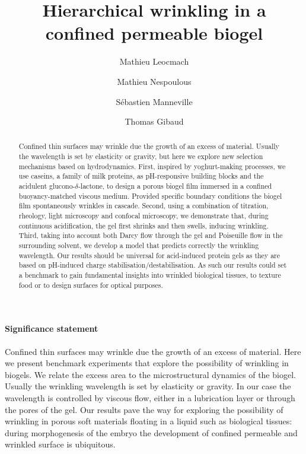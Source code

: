 \documentclass[twocolumn,superscriptaddress,showpacs,preprintnumbers,
amsmath,amssymb,prl]{revtex4-1}
\begin{document}
\title{Hierarchical wrinkling in a confined permeable biogel}
\author{Mathieu Leocmach}
\author{Mathieu Nespoulous}
\author{Sébastien Manneville}
\author{Thomas Gibaud}

\begin{abstract}
Confined thin surfaces may wrinkle due the growth of an excess of material. Usually the wavelength is set by elasticity or gravity, but here we explore new selection mechanisms based on hydrodynamics.
First, inspired by yoghurt-making processes, we use caseins, a family of milk proteins, as pH-responsive building blocks and the acidulent glucono-$\delta$-lactone, to design a porous biogel film immersed in a confined buoyancy-matched viscous medium.
Provided specific boundary conditions the biogel film spontaneously wrinkles in cascade.
Second, using a combination of titration, rheology, light microscopy and confocal microscopy, we demonstrate that, during continuous acidification, the gel first shrinks and then swells, inducing wrinkling. 
Third, taking into account both Darcy flow through the gel and Poiseuille flow in the surrounding solvent, we develop a model that predicts correctly the wrinkling wavelength. Our results should be universal for acid-induced protein gels as they are based on pH-induced charge stabilisation/destabilisation. As such our results could set a benchmark to gain fundamental insights into wrinkled biological tissues, to texture food or to design surfaces for optical purposes.
\end{abstract}

\maketitle

\paragraph*{Significance statement}
Confined thin surfaces may wrinkle due the growth of an excess of material. Here we present benchmark experiments that explore the possibility of wrinkling in biogels. We relate the excess area to the microstructural dynamics of the biogel. Usually the wrinkling wavelength is set by elasticity or gravity. In our case the wavelength is controlled by viscous flow, either in a lubrication layer or through the pores of the gel. Our results pave the way for exploring the possibility of wrinkling in porous soft materials floating in a liquid such as biological tissues: during morphogenesis of the embryo the development of confined permeable and wrinkled surface is ubiquitous.
\end{document}
